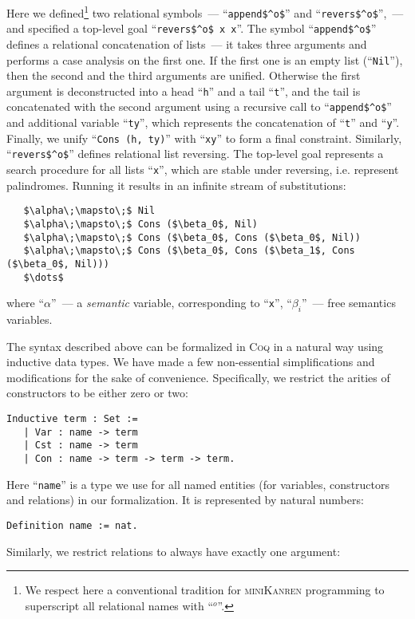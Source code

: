 Here we defined\footnote{We respect here a conventional tradition for \textsc{miniKanren} programming to superscript all relational names with ``$^o$''.}
two relational symbols~--- ``\lstinline|append$^o$|'' and ``\lstinline|revers$^o$|'',~--- and specified a top-level goal ``\lstinline|revers$^o$ x x|''.
The symbol ``\lstinline|append$^o$|'' defines a relational concatenation of lists~--- it takes three arguments and performs a case analysis on the first one. If the
first one is an empty list (``\lstinline|Nil|''), then the second and the third arguments are unified. Otherwise the first argument is deconstructed into a head ``\lstinline|h|''
and a tail ``\lstinline|t|'', and the tail is concatenated with the second argument using a recursive call to ``\lstinline|append$^o$|'' and additional variable ``\lstinline|ty|'', which
represents the concatenation of ``\lstinline|t|'' and ``\lstinline|y|''. Finally, we unify ``\lstinline|Cons (h, ty)|'' with ``\lstinline|xy|'' to form a final constraint. Similarly,
``\lstinline|revers$^o$|'' defines relational list reversing. The top-level goal represents a search procedure for all lists ``\lstinline|x|'', which are stable under reversing, i.e.
represent palindromes. Running it results in an infinite stream of substitutions:

\begin{lstlisting}
   $\alpha\;\mapsto\;$ Nil
   $\alpha\;\mapsto\;$ Cons ($\beta_0$, Nil)
   $\alpha\;\mapsto\;$ Cons ($\beta_0$, Cons ($\beta_0$, Nil))
   $\alpha\;\mapsto\;$ Cons ($\beta_0$, Cons ($\beta_1$, Cons ($\beta_0$, Nil)))
   $\dots$
\end{lstlisting}

where ``$\alpha$''~--- a \emph{semantic} variable, corresponding to ``\lstinline|x|'', ``$\beta_i$''~--- free semantics variables.

The syntax described above can be formalized in \textsc{Coq} in a natural way using inductive data types. We have made a few non-essential simplifications and modifications for the sake of convenience.
Specifically, we restrict the arities of constructors to be either zero or two:

\begin{lstlisting}[language=Coq,basicstyle=\footnotesize]
   Inductive term : Set :=
   | Var : name -> term
   | Cst : name -> term
   | Con : name -> term -> term -> term.
\end{lstlisting}

{ \color{blue} Here ``\lstinline[language=Coq]{name}'' is a type we use for all named entities (for variables, constructors and relations) in our formalization. It is represented by natural numbers:
\begin{lstlisting}[language=Coq,basicstyle=\footnotesize]
  Definition name := nat.
\end{lstlisting}
}
Similarly, we restrict relations to always have exactly one argument:

